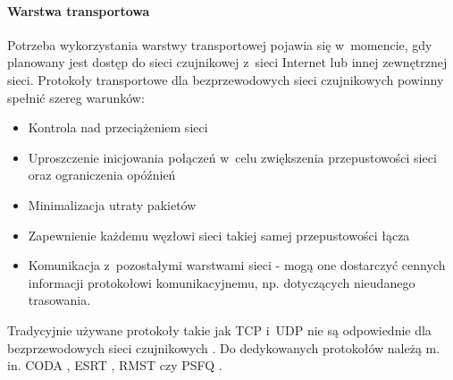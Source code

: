 \paragraph{Warstwa transportowa}
Potrzeba wykorzystania warstwy transportowej pojawia się w~momencie, gdy planowany jest dostęp do sieci czujnikowej z~sieci Internet lub innej zewnętrznej sieci. Protokoły transportowe dla bezprzewodowych sieci czujnikowych powinny spełnić szereg warunków:
\begin{itemize}
\item Kontrola nad przeciążeniem sieci
\item Uproszczenie inicjowania połączeń w~celu zwiększenia przepustowości sieci oraz ograniczenia opóźnień
\item Minimalizacja utraty pakietów
\item Zapewnienie każdemu węzłowi sieci takiej samej przepustowości łącza
\item Komunikacja z~pozostałymi warstwami sieci - mogą one dostarczyć cennych informacji protokołowi komunikacyjnemu, np. dotyczących nieudanego trasowania.
\end{itemize}
Tradycyjnie używane protokoły takie jak TCP i~UDP nie są odpowiednie dla bezprzewodowych sieci czujnikowych \cite{Fahmy2016-2}. Do dedykowanych protokołów należą m. in. CODA \cite{Wan2003}, ESRT \cite{Akan2005}, RMST \cite{Stann2003} czy PSFQ \cite{Wan2002}.

